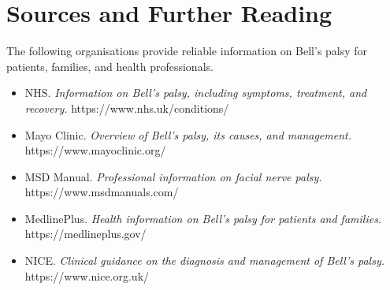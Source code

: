 \section*{Sources and Further Reading}
The following organisations provide reliable information on Bell's palsy for patients, families, and health professionals.

\begin{itemize}
    \item NHS. \textit{Information on Bell's palsy, including symptoms, treatment, and recovery.} https://www.nhs.uk/conditions/
    \item Mayo Clinic. \textit{Overview of Bell's palsy, its causes, and management.} https://www.mayoclinic.org/
    \item MSD Manual. \textit{Professional information on facial nerve palsy.} https://www.msdmanuals.com/
    \item MedlinePlus. \textit{Health information on Bell's palsy for patients and families.} https://medlineplus.gov/
    \item NICE. \textit{Clinical guidance on the diagnosis and management of Bell's palsy.} https://www.nice.org.uk/
\end{itemize}
